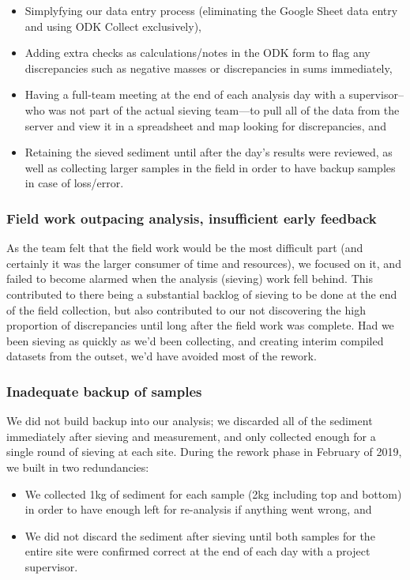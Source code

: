 \documentclass[a4paper,12pt,twoside]{article}
\begin{document}
\begin{itemize}
  \item Simplyfying our data entry process (eliminating the Google Sheet data entry and using ODK Collect exclusively),
  \item Adding extra checks as calculations/notes in the ODK form to flag any discrepancies such as negative masses or discrepancies in sums immediately,
  \item Having a full-team meeting at the end of each analysis day with a supervisor--who was not part of the actual sieving team---to pull all of the data from the server and view it in a spreadsheet and map looking for discrepancies, and
  \item Retaining the sieved sediment until after the day's results were reviewed, as well as collecting larger samples in the field in order to have backup samples in case of loss/error.
\end{itemize}

\color{RHblue}
\subsubsection{Field work outpacing analysis, insufficient early feedback}
\color{RHgrey}
As the team felt that the field work would be the most difficult part (and certainly it was the larger consumer of time and resources), we focused on it, and failed to become alarmed when the analysis (sieving) work fell behind. This contributed to there being a substantial backlog of sieving to be done at the end of the field collection, but also contributed to our not discovering the high proportion of discrepancies until long after the field work was complete. Had we been sieving as quickly as we'd been collecting, and creating interim compiled datasets from the outset, we'd have avoided most of the rework.

\color{RHblue}
\subsubsection{Inadequate backup of samples}
\color{RHgrey}
We did not build backup into our analysis; we discarded all of the sediment immediately after sieving and measurement, and only collected enough for a single round of sieving at each site. During the rework phase in February of 2019, we built in two redundancies:

\begin{itemize}
  \item We collected 1kg of sediment for each sample (2kg including top and bottom) in order to have enough left for re-analysis if anything went wrong, and
  \item We did not discard the sediment after sieving until both samples for the entire site were confirmed correct at the end of each day with a project supervisor.
\end{itemize}
\end{document}
